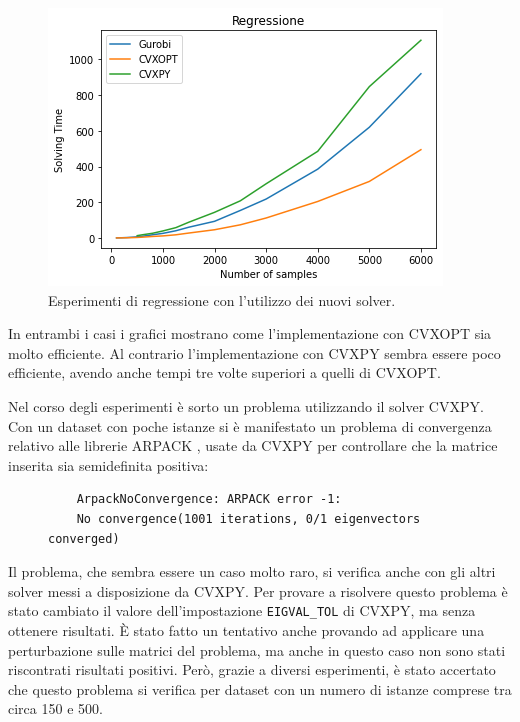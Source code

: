 \documentclass[a4paper,12pt]{report}
\begin{document}
\begin{figure}[H]
    \centering
    \includegraphics[scale=0.8]{images/Grafici/DifferentSolver_Regressione.png}
    \caption{Esperimenti di regressione con l'utilizzo dei nuovi solver.}
    \label{fig:differeSolver_Regressione}
\end{figure}

\noindent In entrambi i casi i grafici mostrano come l'implementazione con CVXOPT sia molto efficiente. Al contrario l'implementazione con CVXPY sembra essere poco efficiente, avendo anche tempi tre volte superiori a quelli di CVXOPT. 

Nel corso degli esperimenti è sorto un problema utilizzando il solver CVXPY. Con un dataset con poche istanze si è manifestato un problema di convergenza relativo alle librerie ARPACK \cite{ARPACK}, usate da CVXPY per controllare che la matrice inserita sia semidefinita positiva:

\begin{figure}[H]
    \centering
    \begin{verbatim}
    ArpackNoConvergence: ARPACK error -1: 
    No convergence(1001 iterations, 0/1 eigenvectors converged)        
    \end{verbatim}
\end{figure}

\noindent Il problema, che sembra essere un caso molto raro, si verifica anche con gli altri solver messi a disposizione da CVXPY. Per provare a risolvere questo problema è stato cambiato il valore dell'impostazione \texttt{EIGVAL\_TOL} di CVXPY, ma senza ottenere risultati. \`E stato fatto un tentativo anche provando ad applicare una perturbazione sulle matrici del problema, ma anche in questo caso non sono stati riscontrati risultati positivi. Però, grazie a diversi esperimenti, è stato accertato che questo problema si verifica per dataset con un numero di istanze comprese tra circa 150 e 500.
\end{document}
